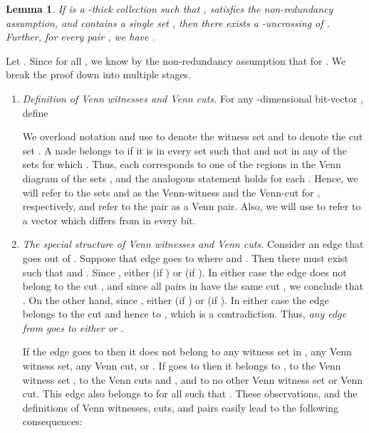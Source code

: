 \documentclass[11pt]{article}
\newtheorem{lemma}[theorem]{Lemma}
\newenvironment{proofnoqed}{{\bf Proof:}}{}
\begin{document}
\begin{lemma}
  \label{lem:uncross}
  If  is a -thick collection such that , 
  satisfies the non-redundancy assumption, and  contains a single
  set , then there exists a -uncrossing  of
  . Further, for every pair , we have .
\end{lemma}
\begin{proofnoqed}
  Let . Since  for all , we know by the non-redundancy assumption that  for . We break the proof down into multiple
  stages.

  \begin{enumerate}
  \item {\em Definition of Venn witnesses and Venn cuts. } For any
    -dimensional bit-vector , define
    

    We overload notation and use  to denote the witness set
     and  to denote the cut set
    . A node  belongs to  if it is in every
    set  such that  and not in any of the sets  for which
    . Thus, each  corresponds to one of the regions in the
    Venn diagram of the sets , and the analogous
    statement holds for each . Hence, we will refer to the sets
     and  as the Venn-witness and the Venn-cut for ,
    respectively, and refer to the pair  as a Venn
    pair. Also, we will use  to refer to a vector which differs
    from  in every bit.

  \item {\em The special structure of Venn witnesses and Venn cuts.} Consider
    an edge  that goes out of . Suppose that edge goes to
     where  and . Then there must exist
     such that  and . Since
    , either  (if ) or  (if ). In either case the edge 
    does not belong to the cut , and since all pairs in 
    have the same cut , we conclude that . On the other
    hand, since , either 
    (if ) or  (if
    ). In either case the edge  belongs to the
    cut  and hence to , which is a contradiction. Thus,
    {\em any edge from  goes to either  or
      }.

    If the edge  goes to  then it does not belong to any
    witness set in , any Venn witness set, any Venn cut, or . If
     goes to  then it belongs to , to the Venn
    witness set , to the Venn cuts  and ,
    and to no other Venn witness set or Venn cut. This edge also belongs to
     for all  such that . These observations, and the
    definitions of Venn witnesses, cuts, and pairs easily lead to the
    following consequences:
    
    
    
    
    

\end{enumerate}
\end{proofnoqed}
\end{document}
